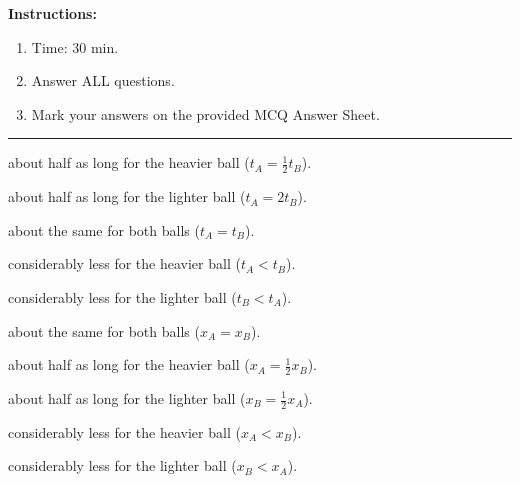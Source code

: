 

    \maketitle

    \eline[-2]
    \textbf{Instructions:}
    \begin{enumerate}
        \item Time: 30 min.
        \item Answer ALL questions.
        \item Mark your answers on the provided MCQ Answer Sheet.
    \end{enumerate}
    \begin{center}\rule{0.7\textwidth}{0.5pt}\end{center}


         \begin{options}
            \item about half as long for the heavier ball ($\displaystyle t_A = \frac{1}{2} t_B$).
            \item about half as long for the lighter ball ($t_A = 2 t_B$).
            \item about the same for both balls ($t_A = t_B$).
            \item considerably less for the heavier ball ($t_A < t_B$).
            \item considerably less for the lighter ball ($t_B < t_A$).
         \end{options}



        \begin{options}
            \item about the same for both balls ($x_A = x_B$).
            \item about half as long for the heavier ball ($\displaystyle x_A = \frac{1}{2} x_B$).
            \item about half as long for the lighter ball ($\displaystyle x_B = \frac{1}{2} x_A$).
            \item considerably less for the heavier ball ($x_A < x_B$).
            \item considerably less for the lighter ball ($x_B < x_A$).
        \end{options}

